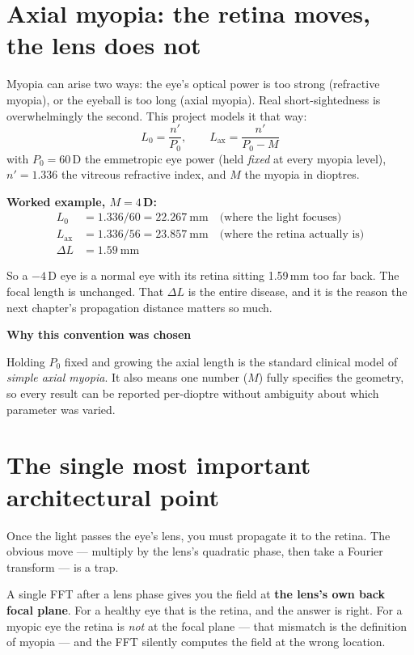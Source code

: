 \documentclass[11pt]{report}
\newenvironment{keybox}[1]%
{\par\vspace{8pt}\begin{lrbox}{\kbsave}\begin{minipage}{0.88\textwidth}%
{\bfseries\color{hbblue}#1}\par\vspace{4pt}\ignorespaces}%
{\end{minipage}\end{lrbox}%
\begin{center}\setlength{\fboxrule}{1.2pt}\setlength{\fboxsep}{8pt}%
\fcolorbox{hbblue}{boxgrey}{\usebox{\kbsave}}\end{center}\vspace{8pt}\par}
\begin{document}
\section{Axial myopia: the retina moves, the lens does not}

Myopia can arise two ways: the eye's optical power is too strong (refractive myopia), or the
eyeball is too long (axial myopia). Real short-sightedness is overwhelmingly the second. This
project models it that way:
\begin{equation}
L_0 = \frac{n'}{P_0}, \qquad L_{\text{ax}} = \frac{n'}{P_0-M}
\label{eq:axial}
\end{equation}
with $P_0 = 60$\,D the emmetropic eye power (held \emph{fixed} at every myopia level),
$n' = 1.336$ the vitreous refractive index, and $M$ the myopia in dioptres.

\textbf{Worked example, $M=4$\,D:}
\begin{align}
L_0 &= 1.336/60 = 22.267\ \text{mm} \quad\text{(where the light focuses)}\\
L_{\text{ax}} &= 1.336/56 = 23.857\ \text{mm} \quad\text{(where the retina actually is)}\\
\Delta L &= 1.59\ \text{mm}
\end{align}

So a $-4$\,D eye is a normal eye with its retina sitting 1.59\,mm too far back. The focal
length is unchanged. That $\Delta L$ is the entire disease, and it is the reason the next
chapter's propagation distance matters so much.

\begin{keybox}{Why this convention was chosen}
Holding $P_0$ fixed and growing the axial length is the standard clinical model of \emph{simple
axial myopia}. It also means one number ($M$) fully specifies the geometry, so every result can
be reported per-dioptre without ambiguity about which parameter was varied.
\end{keybox}

\section{The single most important architectural point}

Once the light passes the eye's lens, you must propagate it to the retina. The obvious move ---
multiply by the lens's quadratic phase, then take a Fourier transform --- is a trap.

A single FFT after a lens phase gives you the field at \textbf{the lens's own back focal plane}.
For a healthy eye that is the retina, and the answer is right. For a myopic eye the retina is
\emph{not} at the focal plane --- that mismatch is the definition of myopia --- and the FFT
silently computes the field at the wrong location.
\end{document}
